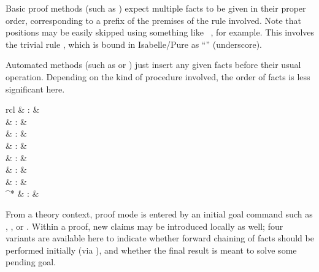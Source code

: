 \begin{isabellebody}
\begin{isamarkuptext}
  Basic proof methods (such as ) expect multiple
  facts to be given in their proper order, corresponding to a prefix
  of the premises of the rule involved.  Note that positions may be
  easily skipped using something like ~, for example.  This involves the trivial rule
  , which is bound in Isabelle/Pure as
  ``\isa{{\isacharunderscore}}'' (underscore).

  Automated methods (such as  or ) just
  insert any given facts before their usual operation.  Depending on
  the kind of procedure involved, the order of facts is less
  significant here.%
\end{isamarkuptext}%
\isamarkuptrue%
%
\isamarkuptrue%
%
\begin{isamarkuptext}%
\begin{matharray}{rcl}
     & : &  \\
     & : &  \\
     & : &  \\
     & : &  \\
     & : &  \\
     & : &  \\
     & : &  \\
    ^* & : &  \\
  \end{matharray}

  From a theory context, proof mode is entered by an initial goal
  command such as , , or
  .  Within a proof, new claims may be
  introduced locally as well; four variants are available here to
  indicate whether forward chaining of facts should be performed
  initially (via ), and whether the final result
  is meant to solve some pending goal.


\end{isamarkuptext}
\end{isabellebody}
